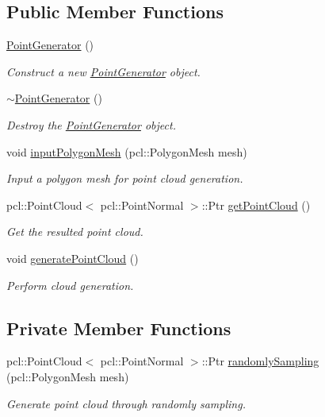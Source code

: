 \subsection*{Public Member Functions}
\begin{DoxyCompactItemize}
\item 
\hyperlink{classpoint__generation_1_1_point_generator_a5420cf73168237696e903aabff5145e5}{Point\+Generator} ()
\begin{DoxyCompactList}\small\item\em Construct a new \hyperlink{classpoint__generation_1_1_point_generator}{Point\+Generator} object. \end{DoxyCompactList}\item 
\hyperlink{classpoint__generation_1_1_point_generator_a6ba5140d919fc003babecec3d3c54563}{$\sim$\+Point\+Generator} ()
\begin{DoxyCompactList}\small\item\em Destroy the \hyperlink{classpoint__generation_1_1_point_generator}{Point\+Generator} object. \end{DoxyCompactList}\item 
void \hyperlink{classpoint__generation_1_1_point_generator_a7ef5fd6c02cf8d0e946830e50e69db21}{input\+Polygon\+Mesh} (pcl\+::\+Polygon\+Mesh mesh)
\begin{DoxyCompactList}\small\item\em Input a polygon mesh for point cloud generation. \end{DoxyCompactList}\item 
pcl\+::\+Point\+Cloud$<$ pcl\+::\+Point\+Normal $>$\+::Ptr \hyperlink{classpoint__generation_1_1_point_generator_ab25233ac5bae73c74976170910b13dcf}{get\+Point\+Cloud} ()
\begin{DoxyCompactList}\small\item\em Get the resulted point cloud. \end{DoxyCompactList}\item 
void \hyperlink{classpoint__generation_1_1_point_generator_a87e2c4dbd27760092ff2e3a6d64bb8d2}{generate\+Point\+Cloud} ()
\begin{DoxyCompactList}\small\item\em Perform cloud generation. \end{DoxyCompactList}\end{DoxyCompactItemize}
\subsection*{Private Member Functions}
\begin{DoxyCompactItemize}
\item 
pcl\+::\+Point\+Cloud$<$ pcl\+::\+Point\+Normal $>$\+::Ptr \hyperlink{classpoint__generation_1_1_point_generator_a19fc856d84db5e6d7b6049ebdf101704}{randomly\+Sampling} (pcl\+::\+Polygon\+Mesh mesh)
\begin{DoxyCompactList}\small\item\em Generate point cloud through randomly sampling. \end{DoxyCompactList}\end{DoxyCompactItemize}
